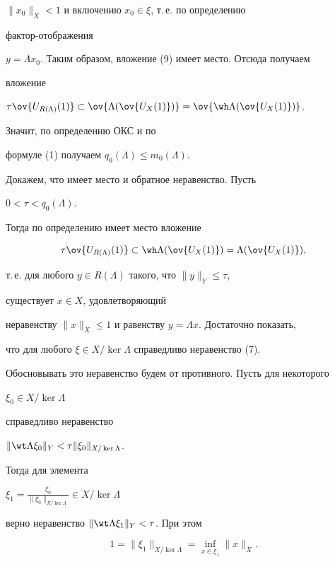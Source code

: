 \begin{pf}
$\|x_0\|_X<1$ и включению $x_0\in\xi$, т.\,е. по определению 


фактор-отображения  


$y=\Lambda x_0$. Таким образом, вложение (9) имеет место. Отсюда получаем 


вложение 


$\tau\ov{U_{R(\Lambda)}(1)}\subset 


\ov{\Lambda(\ov{U_X(1)})}=\ov{\wh\Lambda(\ov{U_X(1)})}$. 


Значит, по определению ОКС и по 


формуле (1) получаем $q_0(\Lambda)\le m_0(\Lambda)$. 


 


Докажем, что имеет место и обратное неравенство. Пусть 


$0<\tau<q_0(\Lambda)$. 


Тогда по определению имеет место вложение 


\begin{equation} 


\tau\ov{U_{R(\Lambda)}(1)}\subset\wh\Lambda 


(\ov{U_X(1)})=\Lambda(\ov{U_X(1)}), 


\end{equation} 


т.\,е. для любого $y\in R(\Lambda)$ такого, что $\|y\|_Y\le\tau$, 


существует $x\in X$, удовлетворяющий 


неравенству $\|x\|_X\le 1$ и равенству $y=\Lambda x$. Достаточно показать, 


что для любого $\xi\in X/\ker\Lambda$ справедливо неравенство (7). 


Обосновывать это неравенство будем от противного. Пусть для некоторого 


$\xi_0\in X/\ker\Lambda$ 


справедливо неравенство 


$\|\wt\Lambda\xi_0\|_Y<\tau\|\xi_0\|_{X/\ker\Lambda}$. 


Тогда для элемента 


$\xi_1=\frac{\xi_0}{\|\xi_0\|_{X/\ker\Lambda}}\in X/\ker\Lambda$ 


верно неравенство $\|\wt\Lambda\xi_1\|_Y<\tau$. При этом 


\begin{equation} 


1=\|\xi_1\|_{X/\ker\Lambda}= 


\inf_{x\in\xi_1}\|x\|_X. 



\end{equation}
\end{pf}
